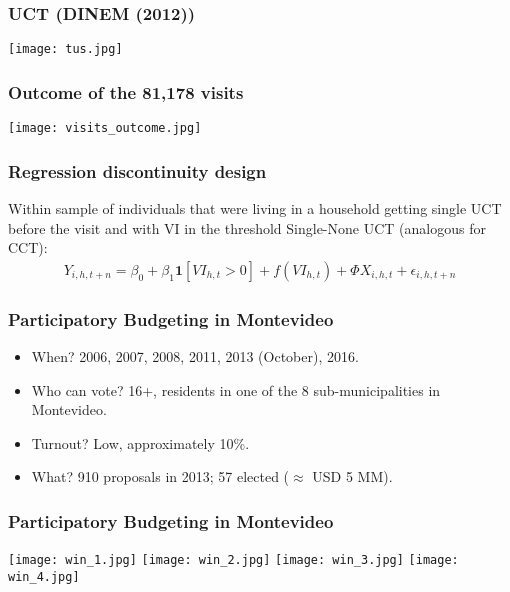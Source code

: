 \documentclass{beamer}
\begin{document}
\begin{frame}
\frametitle{UCT (DINEM (2012))}
\begin{center}
	\texttt{[image: tus.jpg]}
	\label{tus}
\end{center}
\end{frame}

\begin{frame}
\frametitle{Outcome of the 81,178 visits}
\begin{center}
	\texttt{[image: visits\_outcome.jpg]}
	\label{tus}
\end{center}
\end{frame}

\begin{frame}
\frametitle{Regression discontinuity design}
Within sample of individuals that were living in a household getting single UCT before the visit and with VI in the threshold Single-None UCT (analogous for CCT):
\begin{multline}
Y_{i,h,t+n} = \beta _0 + \beta_1\mathbf{1}[VI_{h,t}>0] + f(VI_{h,t}) + \Phi X_{i,h,t} + \epsilon_{i,h,t+n} 
\end{multline}
\end{frame}

\begin{frame}
\frametitle{Participatory Budgeting in Montevideo}
\begin{itemize}
	\item When? 2006, 2007, 2008, 2011, 2013 (October), 2016.
	\item Who can vote? 16+, residents in one of the 8 sub-municipalities in Montevideo.
	\item Turnout? Low, approximately 10\%.
	\item What? 910 proposals in 2013; 57 elected ($\approx$ USD 5 MM).
\end{itemize}
\end{frame}

\begin{frame}
\frametitle{Participatory Budgeting in Montevideo}
\texttt{[image: win\_1.jpg]}
\texttt{[image: win\_2.jpg]}
\texttt{[image: win\_3.jpg]}
\texttt{[image: win\_4.jpg]}
\end{frame}	
\end{document}
